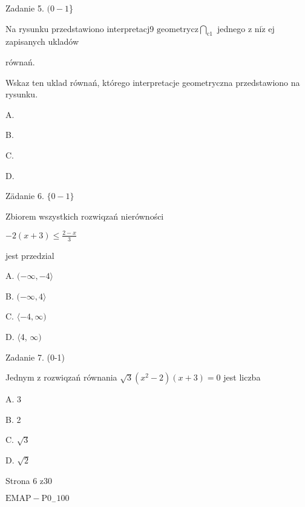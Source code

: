 \documentclass[a4paper,12pt]{article}
\begin{document}
Zadanie 5. $(0-1$\}

Na rysunku przedstawiono interpretacj9 $\displaystyle \mathrm{g}\mathrm{e}\mathrm{o}\mathrm{m}\mathrm{e}\mathrm{t}\mathrm{r}\mathrm{y}\mathrm{c}\mathrm{z}\bigcap_{\mathrm{c}1}$ jednego z $\mathrm{n}\mathrm{i}\dot{\mathrm{z}}$ ej zapisanych ukladów

równań.

Wskaz ten uklad równań, którego interpretacje geometryczna przedstawiono na rysunku.

A. 

B. 

C. 

D. 

Zädanie 6. $\{0-1\}$

Zbiorem wszystkich rozwiqzań nierówności

$-2(x+3)\displaystyle \leq\frac{2-x}{3}$

jest przedzial

A. $(-\infty, -4\rangle$

B. $(-\infty,  4\rangle$

C. $\langle-4, \infty)$

D. $\langle$4, $\infty)$

Zadanie 7. (0-1)

Jednym z rozwiqzań równania $\sqrt{3}(x^{2}-2)(x+3)=0$ jest liczba

A. 3

B. 2

C. $\sqrt{3}$

D. $\sqrt{2}$

Strona 6 z30

$\mathrm{E}\mathrm{M}\mathrm{A}\mathrm{P}-\mathrm{P}0_{-}100$
\end{document}

